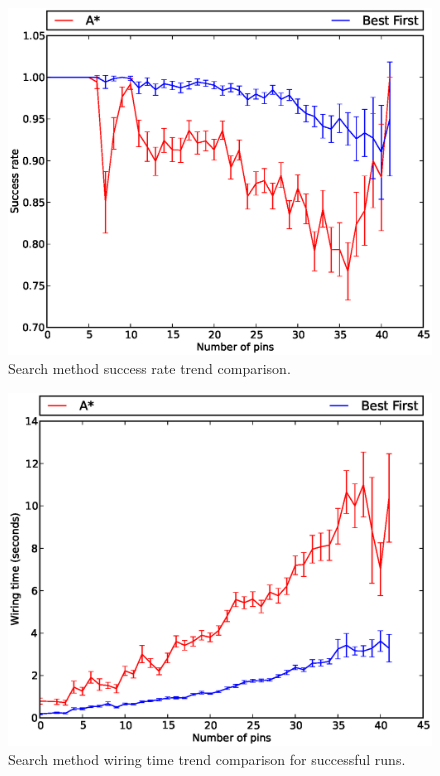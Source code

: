 \begin{figure}[H]
\begin{center}
\includegraphics[width=\textwidth]{Images/search_success_trend_comparison.eps}
\caption[Search method success rate trend comparison]{Search method success rate
trend comparison.}
\label{fig:search_success_trend}
\end{center}
\end{figure}

\begin{figure}[H]
\begin{center}
\includegraphics[width=\textwidth]{Images/search_time_trend_comparison.eps}
\caption[Search method wiring time trend comparison]{Search method wiring time
trend comparison for successful runs.}
\label{fig:search_time_trend}
\end{center}
\end{figure}

